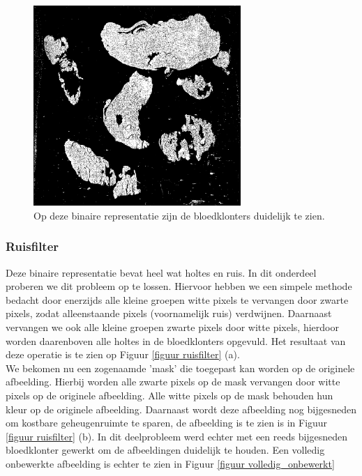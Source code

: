\documentclass[a4paper,kulak]{kulakarticle}
\begin{document}
\begin{figure}[H]
	\centering
	\includegraphics[width=0.7\textwidth]{grijswaarden_bin_vb}
	\caption{Op deze binaire representatie zijn de bloedklonters duidelijk te zien.}
	\label{figuur foto_bin}
\end{figure}

\subsubsection{Ruisfilter}
Deze binaire representatie bevat heel wat holtes en ruis. In dit onderdeel proberen we dit probleem op te lossen. Hiervoor hebben we een simpele methode bedacht door enerzijds alle kleine groepen witte pixels te vervangen door zwarte pixels, zodat alleenstaande pixels (voornamelijk ruis) verdwijnen. Daarnaast vervangen we ook alle kleine groepen zwarte pixels door witte pixels, hierdoor worden daarenboven alle holtes in de bloedklonters opgevuld. Het resultaat van deze operatie is te zien op Figuur \ref{figuur ruisfilter} (a). \\
We bekomen nu een zogenaamde 'mask' die toegepast kan worden op de originele afbeelding. Hierbij worden alle zwarte pixels op de mask vervangen door witte pixels op de originele afbeelding. Alle witte pixels op de mask behouden hun kleur op de originele afbeelding. Daarnaast wordt deze afbeelding nog bijgesneden om kostbare geheugenruimte te sparen, de afbeelding is te zien is in Figuur \ref{figuur ruisfilter} (b). In dit deelprobleem werd echter met een reeds bijgesneden bloedklonter gewerkt om de afbeeldingen duidelijk te houden. Een volledig onbewerkte afbeelding is echter te zien in Figuur \ref{figuur volledig_onbewerkt}
\end{document}

